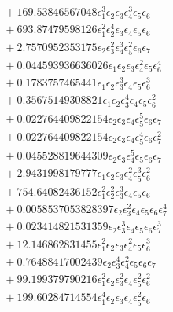 \documentclass[10pt]{article}
\begin{document}
\begin{align*}
&{}  + 169.53846567048 \epsilon_{1}^{3} \epsilon_{2} \epsilon_{3} \epsilon_{4}^{3} \epsilon_{5} \epsilon_{6} \\
&{}  + 693.87479598126 \epsilon_{1}^{2} \epsilon_{2}^{4} \epsilon_{3} \epsilon_{4} \epsilon_{5} \epsilon_{6} \\
&{}  + 2.7570952353175 \epsilon_{2} \epsilon_{3}^{2} \epsilon_{4}^{3} \epsilon_{5}^{2} \epsilon_{6} \epsilon_{7} \\
&{}  + 0.044593936636026 \epsilon_{1} \epsilon_{2} \epsilon_{3} \epsilon_{4}^{2} \epsilon_{5} \epsilon_{6}^{4} \\
&{}  + 0.1783757465441 \epsilon_{1} \epsilon_{2} \epsilon_{3}^{3} \epsilon_{4} \epsilon_{5} \epsilon_{6}^{3} \\
&{}  + 0.35675149308821 \epsilon_{1} \epsilon_{2} \epsilon_{3}^{4} \epsilon_{4} \epsilon_{5} \epsilon_{6}^{2} \\
&{}  + 0.022764409822154 \epsilon_{2} \epsilon_{3} \epsilon_{4} \epsilon_{5}^{5} \epsilon_{6} \epsilon_{7} \\
&{}  + 0.022764409822154 \epsilon_{2} \epsilon_{3} \epsilon_{4} \epsilon_{5}^{4} \epsilon_{6} \epsilon_{7}^{2} \\
&{}  + 0.045528819644309 \epsilon_{2} \epsilon_{3} \epsilon_{4}^{5} \epsilon_{5} \epsilon_{6} \epsilon_{7} \\
&{}  + 2.9431998179777 \epsilon_{1} \epsilon_{2} \epsilon_{3} \epsilon_{4}^{2} \epsilon_{5}^{3} \epsilon_{6}^{2} \\
&{}  + 754.64082436152 \epsilon_{1}^{2} \epsilon_{2}^{2} \epsilon_{3}^{3} \epsilon_{4} \epsilon_{5} \epsilon_{6} \\
&{}  + 0.0058537053828397 \epsilon_{2} \epsilon_{3}^{2} \epsilon_{4} \epsilon_{5} \epsilon_{6} \epsilon_{7}^{4} \\
&{}  + 0.023414821531359 \epsilon_{2} \epsilon_{3}^{3} \epsilon_{4} \epsilon_{5} \epsilon_{6} \epsilon_{7}^{3} \\
&{}  + 12.146862831455 \epsilon_{1}^{2} \epsilon_{2} \epsilon_{3} \epsilon_{4}^{2} \epsilon_{5} \epsilon_{6}^{3} \\
&{}  + 0.76488417002439 \epsilon_{2} \epsilon_{3}^{4} \epsilon_{4}^{2} \epsilon_{5} \epsilon_{6} \epsilon_{7} \\
&{}  + 99.199379790216 \epsilon_{1}^{2} \epsilon_{2} \epsilon_{3}^{2} \epsilon_{4} \epsilon_{5}^{2} \epsilon_{6}^{2} \\
&{}  + 199.60284714554 \epsilon_{1}^{4} \epsilon_{2} \epsilon_{3} \epsilon_{4} \epsilon_{5}^{2} \epsilon_{6} \\

\end{align*}
\end{document}
